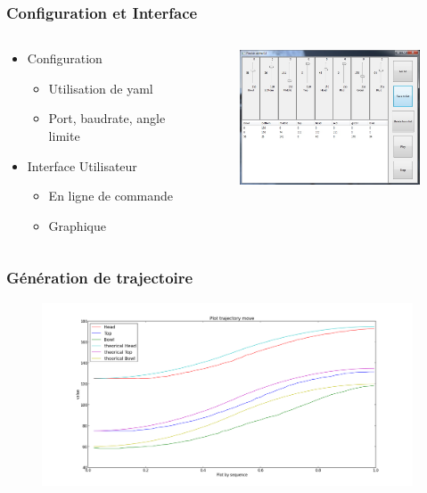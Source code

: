 \begin{frame}
  \frametitle{Configuration et Interface}
  \begin{columns}[T]
    \begin{column}{.4\textwidth}
      \begin{itemize}
        \item Configuration
          \begin{itemize}
            \item Utilisation de yaml
            \item Port, baudrate, angle limite
          \end{itemize}
        \item Interface Utilisateur
          \begin{itemize}
            \item En ligne de commande
            \item Graphique
          \end{itemize}
      \end{itemize}
    \end{column}
    \begin{column}{.6\textwidth}
      \begin{figure}[ht]
        \centering
        \includegraphics[width=6cm]{../img/gui.jpg}
      \end{figure}
    \end{column}
  \end{columns}
\end{frame}

\begin{frame}
  \frametitle{Génération de trajectoire}
            \begin{figure}
                \begin{center}
                    \includegraphics[width=11cm]{../img/TrajectoryPlot.png}
                \end{center}
            \end{figure}
\end{frame}
